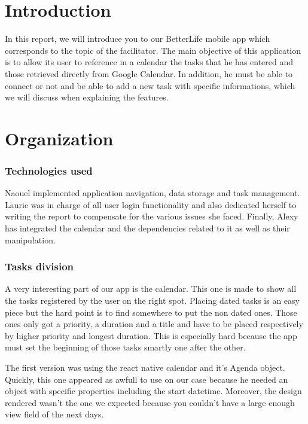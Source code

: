 \documentclass[a4paper,12pt]{article}
\def\Hello{ Project BetterLife Report }
\def\Hello{Welcome!}
\begin{document}
\setlength{\parindent}{0cm}{\Huge \Hello} 
\bigskip
\section*{Introduction}
In this report, we will introduce you to our BetterLife mobile app which corresponds to the topic of the facilitator. The main objective of this application is to allow its user to reference in a calendar the tasks that he has entered and those retrieved directly from Google Calendar. In addition, he must be able to connect or not and be able to add a new task with specific informations, which we will discuss when explaining the features. 

\bigskip
\section*{Organization}

\bigskip
\subsubsection*{Technologies used}

\bigskip
Naouel implemented application navigation, data storage and task management. Laurie was in charge of all user login functionality and also dedicated herself to writing the report to compensate for the various issues she faced. Finally, Alexy has integrated the calendar and the dependencies related to it as well as their manipulation.

\bigskip
\subsubsection*{Tasks division}

\bigskip
A very interesting part of our app is the calendar. This one is made to show all the tasks registered by the user on the right spot. Placing dated tasks is an easy piece but the hard point is to find somewhere to put the non dated ones. Those ones only got a priority, a duration and a title and have to be placed respectively by higher priority and longest duration. This is especially hard because the app must set the beginning of those tasks smartly one after the other.

\bigskip
The first version was using the react native calendar and it's Agenda object. Quickly, this one appeared as awfull to use on our case because he needed an object with specific properties including the start datetime. Moreover, the design rendered wasn't the one we expected because you couldn't have a large enough view field of the next days.
\end{document}
